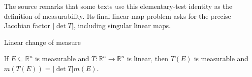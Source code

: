 The source remarks that some texts use this elementary-test identity as the definition of measurability. Its final linear-map problem asks for the precise Jacobian factor \(\left| {\det T} \right|\), including singular linear maps.

\begin{theorem}{Linear change of measure}

If \(E \subseteq \mathbb{R}^{n}\) is measurable and \(T:\mathbb{R}^{n}\rightarrow\mathbb{R}^{n}\) is linear, then \(T(E)\) is measurable and \(m\left( {T(E)} \right) = \left| {\det T} \right|m(E)\).

\end{theorem}
